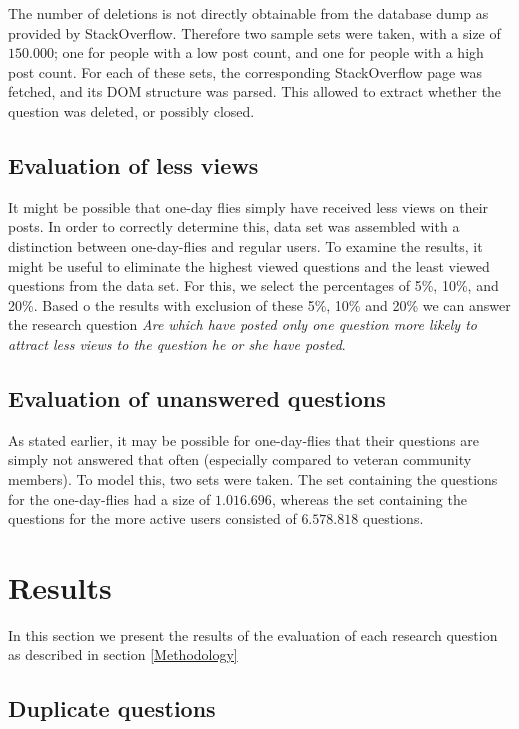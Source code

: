 \documentclass[conference]{IEEEtran}
\begin{document}
The number of deletions is not directly obtainable from the database dump as
provided by StackOverflow. Therefore two sample sets were taken, with a size of
$150.000$; one for people with a low post count, and one for people with a high
post count. For each of these sets, the corresponding StackOverflow page was
fetched, and its DOM structure was parsed. This allowed to extract whether the
question was deleted, or possibly closed.

\subsection{Evaluation of less views}
It might be possible that one-day flies simply have received less views on
their posts.  In order to correctly determine this, data set was assembled with
a distinction between one-day-flies and regular users. To examine the results,
it might be useful to eliminate the highest viewed questions and the least
viewed questions  from the data set. For this, we select the percentages of
5\%, 10\%, and 20\%. Based o the results with exclusion of these 5\%, 10\% and
20\% we can answer the research question \textit{Are which have posted only one
question more likely to attract less views to the question he or she have
posted}.


\subsection{Evaluation of unanswered questions}

As stated earlier, it may be possible for one-day-flies that their questions
are simply not answered that often (especially compared to veteran community
members). To model this, two sets were taken. The set containing the questions
for the one-day-flies had a size of $1.016.696$, whereas the set containing the
questions for the more active users consisted of $6.578.818$ questions.

\section{Results}

In this section we present the results of the evaluation of each research
question as described in section \ref{Methodology}

\subsection{Duplicate questions}
\end{document}
